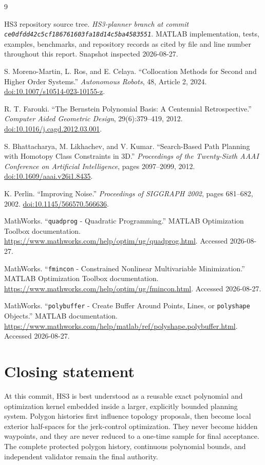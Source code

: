 \documentclass[10pt,letterpaper]{article}
\newcommand{\file}[1]{\nolinkurl{#1}}
\begin{document}
\begin{thebibliography}{9}

HS3 repository source tree.
\emph{HS3-planner branch at commit
\file{ce0dfdd42c5cf186761603fa18d14c5ba4583551}}.
MATLAB implementation, tests, examples, benchmarks, and repository records as
cited by file and line number throughout this report. Snapshot inspected
2026-08-27.

S. Moreno-Martin, L. Ros, and E. Celaya.
``Collocation Methods for Second and Higher Order Systems.''
\emph{Autonomous Robots}, 48, Article 2, 2024.
\href{https://doi.org/10.1007/s10514-023-10155-z}
{doi:10.1007/s10514-023-10155-z}.

R. T. Farouki.
``The Bernstein Polynomial Basis: A Centennial Retrospective.''
\emph{Computer Aided Geometric Design}, 29(6):379--419, 2012.
\href{https://doi.org/10.1016/j.cagd.2012.03.001}
{doi:10.1016/j.cagd.2012.03.001}.

S. Bhattacharya, M. Likhachev, and V. Kumar.
``Search-Based Path Planning with Homotopy Class Constraints in 3D.''
\emph{Proceedings of the Twenty-Sixth AAAI Conference on Artificial
Intelligence}, pages 2097--2099, 2012.
\href{https://doi.org/10.1609/aaai.v26i1.8435}
{doi:10.1609/aaai.v26i1.8435}.

K. Perlin. ``Improving Noise.''
\emph{Proceedings of SIGGRAPH 2002}, pages 681--682, 2002.
\href{https://doi.org/10.1145/566570.566636}
{doi:10.1145/566570.566636}.

MathWorks. ``\file{quadprog} - Quadratic Programming.''
MATLAB Optimization Toolbox documentation.
\url{https://www.mathworks.com/help/optim/ug/quadprog.html}.
Accessed 2026-08-27.

MathWorks. ``\file{fmincon} - Constrained Nonlinear Multivariable
Minimization.'' MATLAB Optimization Toolbox documentation.
\url{https://www.mathworks.com/help/optim/ug/fmincon.html}.
Accessed 2026-08-27.

MathWorks. ``\file{polybuffer} - Create Buffer Around Points, Lines, or
\file{polyshape} Objects.'' MATLAB documentation.
\url{https://www.mathworks.com/help/matlab/ref/polyshape.polybuffer.html}.
Accessed 2026-08-27.

\end{thebibliography}

\section*{Closing statement}

At this commit, HS3 is best understood as a reusable exact polynomial and
optimization kernel embedded inside a larger, explicitly bounded planning
system. Polygon histories first influence topology proposals, then become
local exterior half-spaces for the jerk-control optimization. They never become
hidden waypoints, and they are never reduced to a one-time sample for final
acceptance. The complete protected polygon history, continuous polynomial
bounds, and independent validator remain the final authority.
\end{document}
